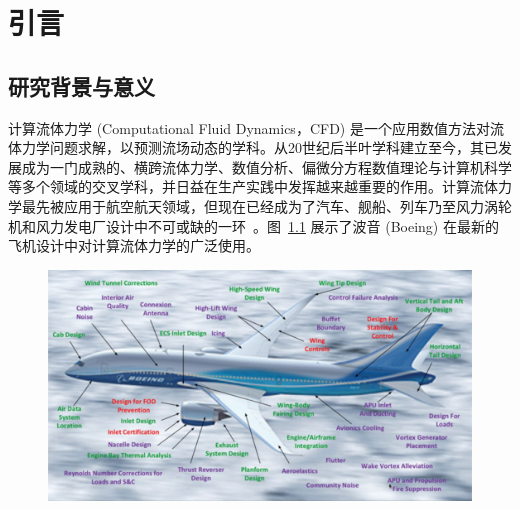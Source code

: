 \chapter{引言}

\section{研究背景与意义}
\label{sec:background}
计算流体力学 (Computational Fluid Dynamics，CFD) 是一个应用数值方法对流体力学问题求解，以预测流场动态的学科。从20世纪后半叶学科建立至今，其已发展成为一门成熟的、横跨流体力学、数值分析、偏微分方程数值理论与计算机科学等多个领域的交叉学科，并日益在生产实践中发挥越来越重要的作用。计算流体力学最先被应用于航空航天领域，但现在已经成为了汽车、舰船、列车乃至风力涡轮机和风力发电厂设计中不可或缺的一环~\cite{https://doi.org/10.1002/we.458}。图~\ref{img:cfd_impact_on_planes} 展示了波音 (Boeing) 在最新的飞机设计中对计算流体力学的广泛使用。

\begin{figure}[htbp]
    \centering
      \includegraphics[width=0.95\columnwidth]{figures/cfd_impact_on_planes.png}
    \label{img:cfd_impact_on_planes}
\end{figure}

